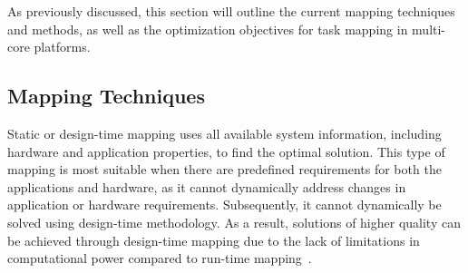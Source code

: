 As previously discussed, this section will outline the current mapping techniques and methods, as well as the optimization objectives for task mapping in multi-core platforms.






\subsection{Mapping Techniques}

Static or design-time mapping uses all available system information, including hardware and application properties, to find the optimal solution. This type of mapping is most suitable when there are predefined requirements for both the applications and hardware, as it cannot dynamically address changes in application or hardware requirements. Subsequently, it cannot dynamically be solved using design-time methodology. As a result, solutions of higher quality can be achieved through design-time mapping due to the lack of limitations in computational power compared to run-time mapping~\cite{askaripoor2022architecture}.






